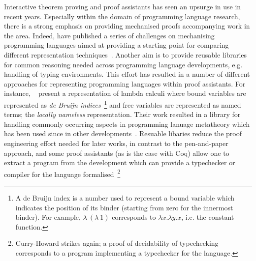 \documentclass{mprop}
\begin{document}
Interactive theorem proving and proof assistants has seen an upsurge in use in recent years. Especially within the domain of programming language research, there is a strong emphasis on providing mechanised proofs accompanying work in the area. Indeed, \citeauthor{Aydemir:2005:MMM} have published a series of challenges on mechanising programming languages aimed at providing a starting point for comparing different representation techniques~\cite{Aydemir:2005:MMM}. Another aim is to provide reusable libraries for common reasoning needed across programming language developments, e.g. handling of typing environments. This effort has resulted in a number of different approaches for representing programming languages within proof assistants. For instance, \citeauthor{Aydemir:2008:EFM}~\cite{Aydemir:2008:EFM} present a representation of lambda calculi where bound variables are represented as \textit{de Bruijn indices}~\footnote{A de Bruijn index is a number used to represent a bound variable which indicates the position of its binder (starting from zero for the innermost binder). For example, $\lambda~(\lambda~1)$ corresponds to $\lambda x. \lambda y. x$, i.e. the constant function.} and free variables are represented as named terms; the \textit{locally nameless} representation. Their work resulted in a library for handling commonly occurring aspects in programming lanuage metatheory which has been used since in other developments~\cite{Park:2014:MMW}. Resuable libaries reduce the proof engineering effort needed for later works, in contrast to the pen-and-paper approach, and some proof assistants (as is the case with Coq) allow one to extract a program from the development which can provide a typechecker or compiler for the language formalised~\footnote{Curry-Howard strikes again; a proof of decidability of typechecking corresponds to a program implementing a typechecker for the language.}


\end{document}
